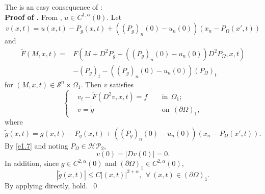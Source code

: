 \documentclass[preprint,12pt]{elsarticle}
\theoremstyle{definition}
\theoremstyle{remark}
\numberwithin{equation}{section}
\begin{document}
The  is an easy consequence of :~\\
\noindent\textbf{Proof of .} From , $u\in C^{1,\alpha}(0)$. Let
\begin{equation*}
v(x,t)=u(x,t)-P_g(x,t)+((P_{g})_n(0)-u_n(0))\left(x_n-P_{\Omega}(x',t)\right)
\end{equation*}
and
\begin{equation*}
\begin{aligned}
\tilde{F}(M,x,t)=&F(M+D^2P_g+((P_{g})_n(0)-u_n(0))D^2P_{\Omega},x,t)\\
&-(P_{g})_t-((P_{g})_n(0)-u_n(0))(P_{\Omega})_t
\end{aligned}
\end{equation*}
for $(M,x,t) \in \mathcal{S}^n\times \Omega_1$.
Then $v$ satisfies
\begin{equation*}
\left\{\begin{aligned}
&v_t-\tilde{F}(D^2v,x,t)=f&& ~~\mbox{in}~~\Omega_1;\\
&v=\tilde{g}&& ~~\mbox{on}~~(\partial \Omega)_1,
\end{aligned}\right.
\end{equation*}
where
\begin{equation*}
  \tilde{g}(x,t)=g(x,t)-P_g(x,t)+((P_{g})_n(0)-u_n(0))\left(x_n-P_{\Omega}(x',t)\right).
\end{equation*}
By \cref{e1.7} and noting $P_{\Omega}\in \mathcal{HP}_2$,
\begin{equation*}
v(0)=|Dv(0)|=0.
\end{equation*}
In addition, since $g\in C^{2,\alpha}(0)$ and $(\partial \Omega)_1\in C^{2,\alpha}(0)$,
\begin{equation*}
|\tilde{g}(x,t)|\leq C|(x,t)|^{2+\alpha},~~\forall ~(x,t)\in (\partial \Omega)_1.
\end{equation*}
By applying  directly,  hold.~\qed~\\
\end{document}
